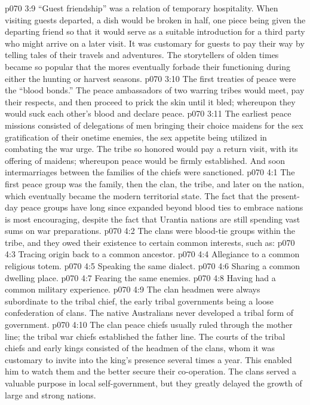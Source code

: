 \vs p070 3:9 “Guest friendship” was a relation of temporary hospitality. When visiting guests departed, a dish would be broken in half, one piece being given the departing friend so that it would serve as a suitable introduction for a third party who might arrive on a later visit. It was customary for guests to pay their way by telling tales of their travels and adventures. The storytellers of olden times became so popular that the mores eventually forbade their functioning during either the hunting or harvest seasons.
\vs p070 3:10 The first treaties of peace were the “blood bonds.” The peace ambassadors of two warring tribes would meet, pay their respects, and then proceed to prick the skin until it bled; whereupon they would suck each other’s blood and declare peace.
\vs p070 3:11 The earliest peace missions consisted of delegations of men bringing their choice maidens for the sex gratification of their onetime enemies, the sex appetite being utilized in combating the war urge. The tribe so honored would pay a return visit, with its offering of maidens; whereupon peace would be firmly established. And soon intermarriages between the families of the chiefs were sanctioned.
\vs p070 4:1 The first peace group was the family, then the clan, the tribe, and later on the nation, which eventually became the modern territorial state. The fact that the present\hyp{}day peace groups have long since expanded beyond blood ties to embrace nations is most encouraging, despite the fact that Urantia nations are still spending vast sums on war preparations.
\vs p070 4:2 The clans were blood\hyp{}tie groups within the tribe, and they owed their existence to certain common interests, such as:
\vs p070 4:3 \pc {}\bibnobreakspace Tracing origin back to a common ancestor.
\vs p070 4:4 \bibnobreakspace Allegiance to a common religious totem.
\vs p070 4:5 \bibnobreakspace Speaking the same dialect.
\vs p070 4:6 \bibnobreakspace Sharing a common dwelling place.
\vs p070 4:7 \bibnobreakspace Fearing the same enemies.
\vs p070 4:8 \bibnobreakspace Having had a common military experience.
\vs p070 4:9 \pc The clan headmen were always subordinate to the tribal chief, the early tribal governments being a loose confederation of clans. The native Australians never developed a tribal form of government.
\vs p070 4:10 The clan peace chiefs usually ruled through the mother line; the tribal war chiefs established the father line. The courts of the tribal chiefs and early kings consisted of the headmen of the clans, whom it was customary to invite into the king’s presence several times a year. This enabled him to watch them and the better secure their co\hyp{}operation. The clans served a valuable purpose in local self\hyp{}government, but they greatly delayed the growth of large and strong nations.
